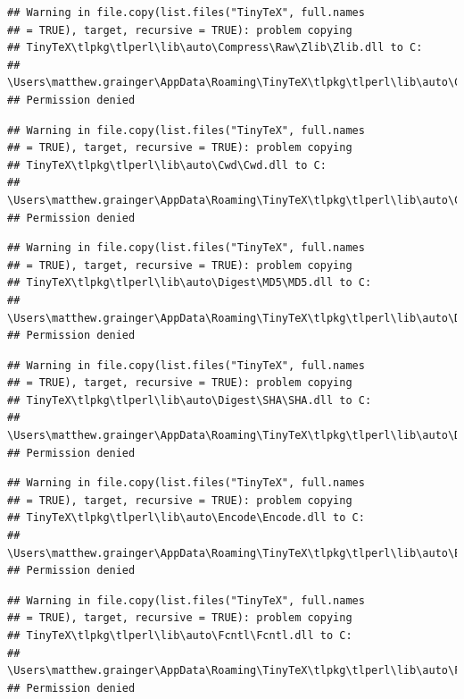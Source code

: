 \documentclass[]{article}
\begin{document}
\begin{verbatim}
## Warning in file.copy(list.files("TinyTeX", full.names
## = TRUE), target, recursive = TRUE): problem copying
## TinyTeX\tlpkg\tlperl\lib\auto\Compress\Raw\Zlib\Zlib.dll to C:
## \Users\matthew.grainger\AppData\Roaming\TinyTeX\tlpkg\tlperl\lib\auto\Compress\Raw\Zlib\Zlib.dll:
## Permission denied
\end{verbatim}

\begin{verbatim}
## Warning in file.copy(list.files("TinyTeX", full.names
## = TRUE), target, recursive = TRUE): problem copying
## TinyTeX\tlpkg\tlperl\lib\auto\Cwd\Cwd.dll to C:
## \Users\matthew.grainger\AppData\Roaming\TinyTeX\tlpkg\tlperl\lib\auto\Cwd\Cwd.dll:
## Permission denied
\end{verbatim}

\begin{verbatim}
## Warning in file.copy(list.files("TinyTeX", full.names
## = TRUE), target, recursive = TRUE): problem copying
## TinyTeX\tlpkg\tlperl\lib\auto\Digest\MD5\MD5.dll to C:
## \Users\matthew.grainger\AppData\Roaming\TinyTeX\tlpkg\tlperl\lib\auto\Digest\MD5\MD5.dll:
## Permission denied
\end{verbatim}

\begin{verbatim}
## Warning in file.copy(list.files("TinyTeX", full.names
## = TRUE), target, recursive = TRUE): problem copying
## TinyTeX\tlpkg\tlperl\lib\auto\Digest\SHA\SHA.dll to C:
## \Users\matthew.grainger\AppData\Roaming\TinyTeX\tlpkg\tlperl\lib\auto\Digest\SHA\SHA.dll:
## Permission denied
\end{verbatim}

\begin{verbatim}
## Warning in file.copy(list.files("TinyTeX", full.names
## = TRUE), target, recursive = TRUE): problem copying
## TinyTeX\tlpkg\tlperl\lib\auto\Encode\Encode.dll to C:
## \Users\matthew.grainger\AppData\Roaming\TinyTeX\tlpkg\tlperl\lib\auto\Encode\Encode.dll:
## Permission denied
\end{verbatim}

\begin{verbatim}
## Warning in file.copy(list.files("TinyTeX", full.names
## = TRUE), target, recursive = TRUE): problem copying
## TinyTeX\tlpkg\tlperl\lib\auto\Fcntl\Fcntl.dll to C:
## \Users\matthew.grainger\AppData\Roaming\TinyTeX\tlpkg\tlperl\lib\auto\Fcntl\Fcntl.dll:
## Permission denied
\end{verbatim}
\end{document}
